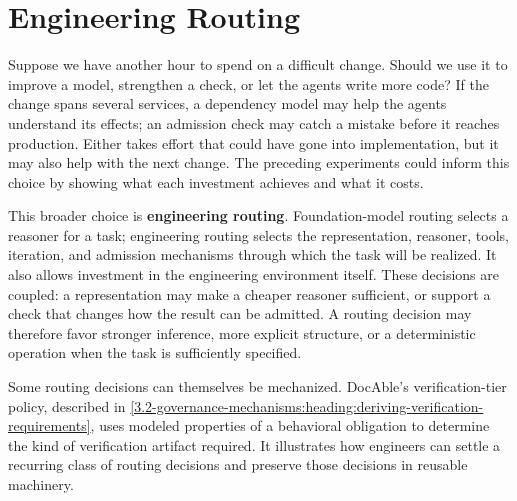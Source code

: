 \section{Engineering Routing}\label{heading:research-optimizing-the-engineering-environment}


Suppose we have another hour to spend on a difficult change. Should we use it to improve a model, strengthen a check, or let the agents write more code? If the change spans several services, a dependency model may help the agents understand its effects; an admission check may catch a mistake before it reaches production. Either takes effort that could have gone into implementation, but it may also help with the next change. The preceding experiments could inform this choice by showing what each investment achieves and what it costs.

This broader choice is \textbf{engineering routing}. Foundation-model routing selects a reasoner for a task; engineering routing selects the representation, reasoner, tools, iteration, and admission mechanisms through which the task will be realized. It also allows investment in the engineering environment itself. These decisions are coupled: a representation may make a cheaper reasoner sufficient, or support a check that changes how the result can be admitted. A routing decision may therefore favor stronger inference, more explicit structure, or a deterministic operation when the task is sufficiently specified.

Some routing decisions can themselves be mechanized. DocAble's verification-tier policy, described in \autoref{3.2-governance-mechanisms:heading:deriving-verification-requirements}, uses modeled properties of a behavioral obligation to determine the kind of verification artifact required. It illustrates how engineers can settle a recurring class of routing decisions and preserve those decisions in reusable machinery.


